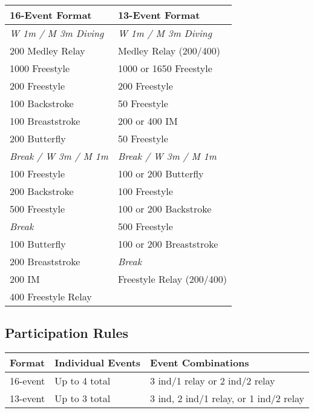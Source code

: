 \begin{table}[H]
\centering
\small
\begin{tabular}{|p{5.5cm}|p{5.5cm}|}
\hline
\rowcolor{teamprimary!20}
\textbf{16-Event Format} & \textbf{13-Event Format} \\
\hline
\rowcolor{teamprimary!5}
\textit{W 1m / M 3m Diving} & \textit{W 1m / M 3m Diving} \\
200 Medley Relay & Medley Relay (200/400) \\
\rowcolor{teamprimary!5}
1000 Freestyle & 1000 or 1650 Freestyle \\
200 Freestyle & 200 Freestyle \\
\rowcolor{teamprimary!5}
100 Backstroke & 50 Freestyle \\
100 Breaststroke & 200 or 400 IM \\
\rowcolor{teamprimary!5}
200 Butterfly & 50 Freestyle \\
\textit{Break / W 3m / M 1m} & \textit{Break / W 3m / M 1m} \\
\rowcolor{teamprimary!5}
100 Freestyle & 100 or 200 Butterfly \\
200 Backstroke & 100 Freestyle \\
\rowcolor{teamprimary!5}
500 Freestyle & 100 or 200 Backstroke \\
\textit{Break} & 500 Freestyle \\
\rowcolor{teamprimary!5}
100 Butterfly & 100 or 200 Breaststroke \\
200 Breaststroke & \textit{Break} \\
\rowcolor{teamprimary!5}
200 IM & Freestyle Relay (200/400) \\
400 Freestyle Relay &  \\
\hline
\end{tabular}
\end{table}


\subsection{Participation Rules}

\begin{table}[H]
\centering
\small
\begin{tabular}{|p{3cm}|p{4cm}|p{5cm}|}
\hline
\rowcolor{teamprimary!20}
\textbf{Format} & \textbf{Individual Events} & \textbf{Event Combinations} \\
\hline
\rowcolor{teamprimary!5}
16-event & Up to 4 total & 3 ind/1 relay or 2 ind/2 relay \\
\hline
\rowcolor{teamprimary!5}
13-event & Up to 3 total & 3 ind, 2 ind/1 relay, or 1 ind/2 relay \\
\hline
\end{tabular}
\end{table}
